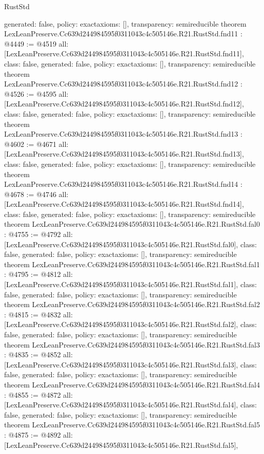 \begin{lexlean}{RustStd}
\begin{coremodule}
{  generated: false,
  policy: exact{axioms: []},
  transparency: semireducible
}
theorem LexLeanPreserve.Cc639d244984595f0311043c4c505146e.R21.RustStd.fnd11 : @4449 := @4519 {
  all: [LexLeanPreserve.Cc639d244984595f0311043c4c505146e.R21.RustStd.fnd11],
  class: false,
  generated: false,
  policy: exact{axioms: []},
  transparency: semireducible
}
theorem LexLeanPreserve.Cc639d244984595f0311043c4c505146e.R21.RustStd.fnd12 : @4526 := @4595 {
  all: [LexLeanPreserve.Cc639d244984595f0311043c4c505146e.R21.RustStd.fnd12],
  class: false,
  generated: false,
  policy: exact{axioms: []},
  transparency: semireducible
}
theorem LexLeanPreserve.Cc639d244984595f0311043c4c505146e.R21.RustStd.fnd13 : @4602 := @4671 {
  all: [LexLeanPreserve.Cc639d244984595f0311043c4c505146e.R21.RustStd.fnd13],
  class: false,
  generated: false,
  policy: exact{axioms: []},
  transparency: semireducible
}
theorem LexLeanPreserve.Cc639d244984595f0311043c4c505146e.R21.RustStd.fnd14 : @4678 := @4746 {
  all: [LexLeanPreserve.Cc639d244984595f0311043c4c505146e.R21.RustStd.fnd14],
  class: false,
  generated: false,
  policy: exact{axioms: []},
  transparency: semireducible
}
theorem LexLeanPreserve.Cc639d244984595f0311043c4c505146e.R21.RustStd.fal0 : @4755 := @4792 {
  all: [LexLeanPreserve.Cc639d244984595f0311043c4c505146e.R21.RustStd.fal0],
  class: false,
  generated: false,
  policy: exact{axioms: []},
  transparency: semireducible
}
theorem LexLeanPreserve.Cc639d244984595f0311043c4c505146e.R21.RustStd.fal1 : @4795 := @4812 {
  all: [LexLeanPreserve.Cc639d244984595f0311043c4c505146e.R21.RustStd.fal1],
  class: false,
  generated: false,
  policy: exact{axioms: []},
  transparency: semireducible
}
theorem LexLeanPreserve.Cc639d244984595f0311043c4c505146e.R21.RustStd.fal2 : @4815 := @4832 {
  all: [LexLeanPreserve.Cc639d244984595f0311043c4c505146e.R21.RustStd.fal2],
  class: false,
  generated: false,
  policy: exact{axioms: []},
  transparency: semireducible
}
theorem LexLeanPreserve.Cc639d244984595f0311043c4c505146e.R21.RustStd.fal3 : @4835 := @4852 {
  all: [LexLeanPreserve.Cc639d244984595f0311043c4c505146e.R21.RustStd.fal3],
  class: false,
  generated: false,
  policy: exact{axioms: []},
  transparency: semireducible
}
theorem LexLeanPreserve.Cc639d244984595f0311043c4c505146e.R21.RustStd.fal4 : @4855 := @4872 {
  all: [LexLeanPreserve.Cc639d244984595f0311043c4c505146e.R21.RustStd.fal4],
  class: false,
  generated: false,
  policy: exact{axioms: []},
  transparency: semireducible
}
theorem LexLeanPreserve.Cc639d244984595f0311043c4c505146e.R21.RustStd.fal5 : @4875 := @4892 {
  all: [LexLeanPreserve.Cc639d244984595f0311043c4c505146e.R21.RustStd.fal5],
}
\end{coremodule}
\end{lexlean}
